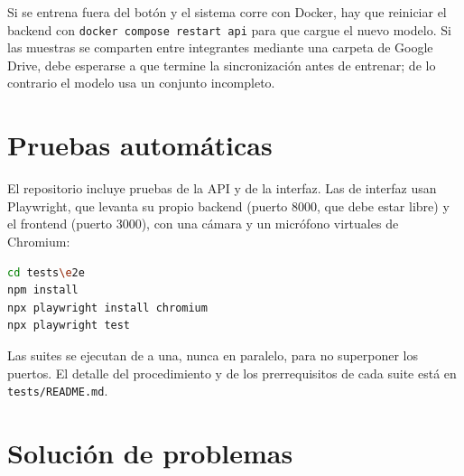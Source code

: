 Si se entrena fuera del botón y el sistema corre con Docker, hay que reiniciar el backend con \texttt{docker compose restart api} para que cargue el nuevo modelo. Si las muestras se comparten entre integrantes mediante una carpeta de Google Drive, debe esperarse a que termine la sincronización antes de entrenar; de lo contrario el modelo usa un conjunto incompleto.
\section{Pruebas automáticas}

El repositorio incluye pruebas de la API y de la interfaz. Las de interfaz usan Playwright, que levanta su propio backend (puerto 8000, que debe estar libre) y el frontend (puerto 3000), con una cámara y un micrófono virtuales de Chromium:

\begin{lstlisting}[numbers=none, language=bash]
cd tests\e2e
npm install
npx playwright install chromium
npx playwright test
\end{lstlisting}

Las suites se ejecutan de a una, nunca en paralelo, para no superponer los puertos. El detalle del procedimiento y de los prerrequisitos de cada suite está en \texttt{tests/README.md}.

\section{Solución de problemas}

